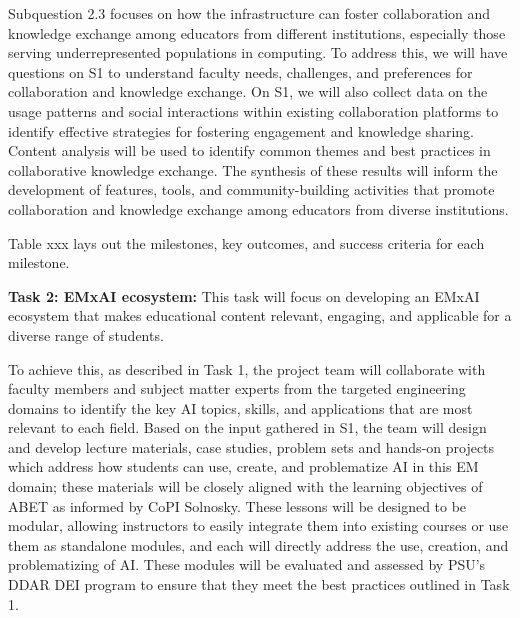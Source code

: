 \documentclass[11pt]{article}
\begin{document}
Subquestion 2.3 focuses on how the infrastructure can foster collaboration and knowledge exchange among educators from different institutions, especially those serving underrepresented populations in computing. 
To address this, we will have questions on S1 to understand faculty needs, challenges, and preferences for collaboration and knowledge exchange. 
On S1, we will also collect data on the usage patterns and social interactions within existing collaboration platforms to identify effective strategies for fostering engagement and knowledge sharing. 
Content analysis will be used to identify common themes and best practices in collaborative knowledge exchange. 
The synthesis of these results will inform the development of features, tools, and community-building activities that promote collaboration and knowledge exchange among educators from diverse institutions. 


Table xxx lays out the milestones, key outcomes, and success criteria for each milestone. 

\begin{tcolorbox}[colback=mycmykcolor, colframe=black, boxrule=1pt, coltext=black]
\textbf{Task 2: EMxAI ecosystem:} This task will focus on developing an EMxAI ecosystem that makes educational content relevant, engaging, and applicable for a diverse range of students.
\end{tcolorbox}

To achieve this, as described in Task 1, the project team will collaborate with faculty members and subject matter experts from the targeted engineering domains to identify the key AI topics, skills, and applications that are most relevant to each field. 
Based on the input gathered in S1, the team will design and develop lecture materials, case studies, problem sets and hands-on projects which address how students can use, create, and problematize AI in this EM domain; these materials will be closely aligned with the learning objectives of ABET as informed by CoPI Solnosky. 
These lessons will be designed to be modular, allowing instructors to easily integrate them into existing courses or use them as standalone modules, and each will directly address the use, creation, and problematizing of AI.
These modules will be evaluated and assessed by PSU's DDAR DEI program to ensure that they meet the best practices outlined in Task 1. 
\end{document}
